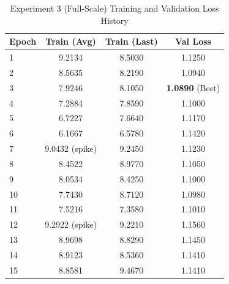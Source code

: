 \documentclass[12pt, conference, letterpaper]{IEEEtran}
\begin{document}
\begin{table}[h]
    \caption{Experiment 3 (Full-Scale) Training and Validation Loss History}
    \label{tab:qwen_loss_history_full}
    \centering
    \footnotesize
    \begin{tabular}{lccc}
        \toprule
        \textbf{Epoch} & \textbf{Train (Avg)} & \textbf{Train (Last)} & \textbf{Val Loss}      \\ \midrule
        1              & 9.2134               & 8.5030                & 1.1250                 \\
        2              & 8.5635               & 8.2190                & 1.0940                 \\
        3              & 7.9246               & 8.1050                & \textbf{1.0890} (Best) \\
        4              & 7.2884               & 7.8590                & 1.1000                 \\
        5              & 6.7227               & 7.6640                & 1.1170                 \\
        6              & 6.1667               & 6.5780                & 1.1420                 \\
        7              & 9.0432 (spike)       & 9.2450                & 1.1230                 \\
        8              & 8.4522               & 8.9770                & 1.1050                 \\
        9              & 8.0534               & 8.4250                & 1.1000                 \\
        10             & 7.7430               & 8.7120                & 1.0980                 \\
        11             & 7.5216               & 7.3580                & 1.1010                 \\
        12             & 9.2922 (spike)       & 9.2210                & 1.1560                 \\
        13             & 8.9698               & 8.8290                & 1.1450                 \\
        14             & 8.9123               & 8.5360                & 1.1410                 \\
        15             & 8.8581               & 9.4670                & 1.1410                 \\
        \bottomrule
    \end{tabular}
\end{table}
\end{document}
